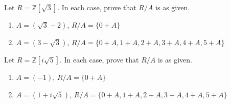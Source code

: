 
\newcommand{\C}{\mathbb{C}}
\newcommand{\Q}{\mathbb{Q}}
\newcommand{\R}{\mathbb{R}}
\newcommand{\Z}{\mathbb{Z}}


Let $R=\Z[\sqrt{3}]$. In each case, prove that $R/A$ is as given.  	
	\begin{enumerate}[label=(\alph*)]
		\item $A=(\sqrt{3}-2)$, $R/A=\{0+A\}$\vfill
		\item $A=(3-\sqrt{3})$, $R/A=\{0+A,1+A,2+A,3+A,4+A,5+A\}$\vfill
	\end{enumerate}
	

Let $R=\Z[i\sqrt{5}]$. In each case, prove that $R/A$ is as given.  	
	\begin{enumerate}[label=(\alph*)]
		\item $A=(-1)$, $R/A=\{0+A\}$\vfill
		\item $A=(1+i\sqrt{5})$, $R/A=\{0+A,1+A,2+A,3+A,4+A,5+A\}$\vfill
	\end{enumerate}